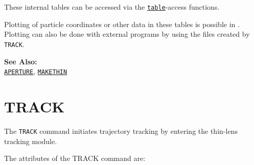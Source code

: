 These internal tables can be accessed via the
\href{../Introduction/expression.html#table}{\texttt{table}}-access
functions.      

Plotting of particle coordinates or other data in these tables is
possible in \madx. Plotting can also be done with external programs by
using the files created by \texttt{TRACK}.  

{\bf See Also:}\\
\href{../Introduction/aperture.html}{\texttt{APERTURE}}, 
\href{../makethin/makethin.html}{\texttt{MAKETHIN}}



\section{TRACK}
\label{sec:track}

The \texttt{TRACK} command initiates trajectory tracking by entering the 
thin-lens tracking module. 


The attributes of the TRACK command are:

